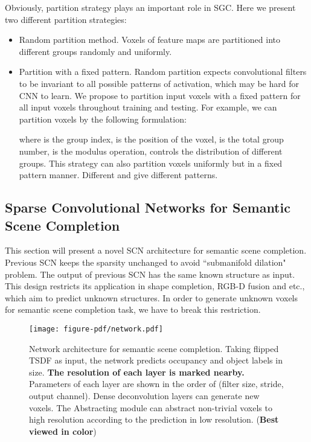 \documentclass[runningheads]{llncs}
\begin{document}
Obviously, partition strategy plays an important role in SGC. Here we present two different partition strategies:
\begin{itemize}
  \item Random partition method. Voxels of feature maps are partitioned into different groups randomly and uniformly.
  \item Partition with a fixed pattern. Random partition expects convolutional filters to be invariant to all possible patterns of activation, which may be hard for CNN to learn. We propose to partition input voxels with a fixed pattern for all input voxels throughout training and testing. For example, we can partition voxels by the following formulation:



where  is the group index,  is the position of the voxel,  is the total group number,  is the modulus operation,  controls the distribution of different groups. This strategy can also partition voxels uniformly but in a fixed pattern manner. Different  and  give different patterns.
\end{itemize}

\subsection{Sparse Convolutional Networks for Semantic Scene Completion}
This section will present a novel SCN architecture for semantic scene completion. Previous SCN \cite{GrahamSCN} keeps the sparsity unchanged to avoid ``submanifold dilation" problem. The output of previous SCN has the same known structure as input. This design restricts its application in shape completion, RGB-D fusion and etc., which aim to predict unknown structures. In order to generate unknown voxels for semantic scene completion task, we have to break this restriction.

\begin{figure}[t]
\centering
\texttt{[image: figure-pdf/network.pdf]}
\caption{Network architecture for semantic scene completion. Taking flipped TSDF as input, the network predicts occupancy and object labels in  size. \textbf{The resolution of each layer is marked nearby.} Parameters of each layer are shown in the order of (filter size, stride, output channel). Dense deconvolution layers can generate new voxels. The Abstracting module can abstract non-trivial voxels to high resolution according to the prediction in low resolution. (\textbf{Best viewed in color})}
\label{fig:network}
\end{figure}
\end{document}
